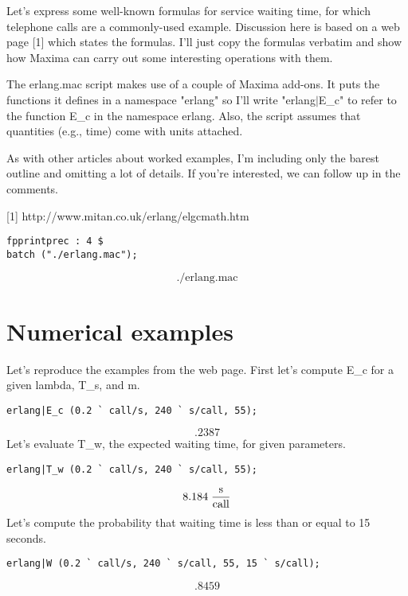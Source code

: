 \documentclass[12pt]{article}
\begin{document}
Let's express some well-known formulas for service waiting time,
for which telephone calls are a commonly-used example.
Discussion here is based on a web page [1] which states the formulas.
I'll just copy the formulas verbatim and show how Maxima can carry out
some interesting operations with them.

The erlang.mac script makes use of a couple of Maxima add-ons.
It puts the functions it defines in a namespace "erlang"
so I'll write "erlang$|$E_c" to refer to the function E_c in the namespace erlang.
Also, the script assumes that quantities (e.g., time) come with units attached.

As with other articles about worked examples,
I'm including only the barest outline and omitting a lot of details.
If you're interested, we can follow up in the comments.

[1] http://www.mitan.co.uk/erlang/elgcmath.htm
\begin{verbatim}
fpprintprec : 4 $
batch ("./erlang.mac");
\end{verbatim}
$$\mbox{{}./erlang.mac{}}$$
\section{Numerical examples
}
Let's reproduce the examples from the web page.
First let's compute E_c for a given lambda, T_s, and m.
\begin{verbatim}
erlang|E_c (0.2 ` call/s, 240 ` s/call, 55);
\end{verbatim}
$$.2387$$
Let's evaluate T_w, the expected waiting time, for given parameters.
\begin{verbatim}
erlang|T_w (0.2 ` call/s, 240 ` s/call, 55);
\end{verbatim}
$$8.184\;{{\mathrm{s}}\over{\mathrm{call}}}$$
Let's compute the probability that waiting time is less than or equal to 15 seconds.
\begin{verbatim}
erlang|W (0.2 ` call/s, 240 ` s/call, 55, 15 ` s/call);
\end{verbatim}
$$.8459$$
\end{document}
